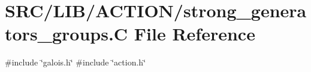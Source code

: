 \hypertarget{strong__generators__groups_8_c}{}\section{S\+R\+C/\+L\+I\+B/\+A\+C\+T\+I\+O\+N/strong\+\_\+generators\+\_\+groups.C File Reference}
\label{strong__generators__groups_8_c}
{\ttfamily \#include \char`\"{}galois.\+h\char`\"{}}\newline
{\ttfamily \#include \char`\"{}action.\+h\char`\"{}}\newline
